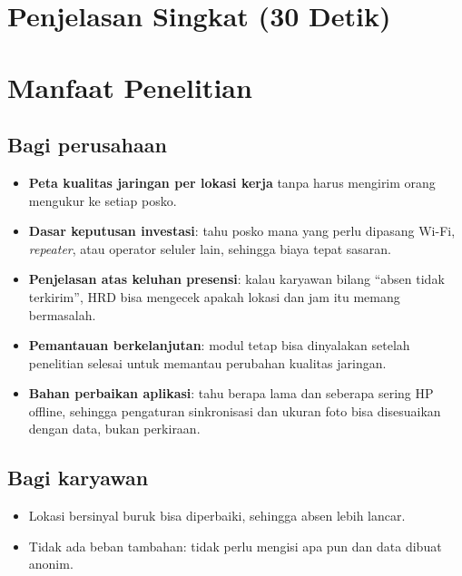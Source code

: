 \documentclass[11pt,a4paper]{article}
\begin{document}
\section{Penjelasan Singkat (30 Detik)}

\section{Manfaat Penelitian}
\subsection{Bagi perusahaan}
\begin{itemize}
\item \textbf{Peta kualitas jaringan per lokasi kerja} tanpa harus mengirim orang mengukur ke setiap posko.
\item \textbf{Dasar keputusan investasi}: tahu posko mana yang perlu dipasang Wi-Fi, \textit{repeater}, atau operator seluler lain, sehingga biaya tepat sasaran.
\item \textbf{Penjelasan atas keluhan presensi}: kalau karyawan bilang ``absen tidak terkirim'', HRD bisa mengecek apakah lokasi dan jam itu memang bermasalah.
\item \textbf{Pemantauan berkelanjutan}: modul tetap bisa dinyalakan setelah penelitian selesai untuk memantau perubahan kualitas jaringan.
\item \textbf{Bahan perbaikan aplikasi}: tahu berapa lama dan seberapa sering HP offline, sehingga pengaturan sinkronisasi dan ukuran foto bisa disesuaikan dengan data, bukan perkiraan.
\end{itemize}
\subsection{Bagi karyawan}
\begin{itemize}
\item Lokasi bersinyal buruk bisa diperbaiki, sehingga absen lebih lancar.
\item Tidak ada beban tambahan: tidak perlu mengisi apa pun dan data dibuat anonim.
\end{itemize}
\end{document}
